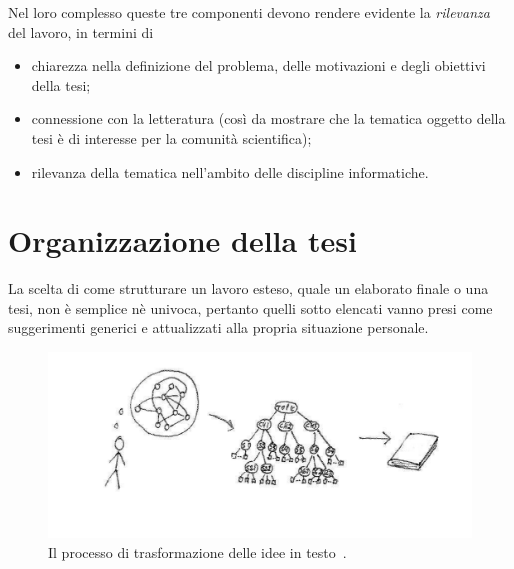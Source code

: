 \documentclass[12pt]{report}
\begin{document}
Nel loro complesso queste tre componenti devono rendere evidente la {\em rilevanza} del lavoro, in termini di
\begin{itemize}
\item chiarezza nella definizione del problema, delle motivazioni e degli obiettivi della tesi; 
\item connessione con la letteratura (cos\`i da mostrare che la tematica oggetto della tesi \`e di interesse per la comunit\`a scientifica);
\item rilevanza della tematica nell'ambito delle discipline informatiche.
\end{itemize}


\section{Organizzazione della tesi}
\label{sec:organizzazione}

La scelta di come strutturare un lavoro esteso, quale un elaborato finale o una tesi, non è semplice n\`{e} univoca, pertanto quelli sotto elencati vanno presi come suggerimenti generici e attualizzati alla propria situazione personale.

\begin{figure}[t]
	\centering
	\includegraphics[width = \textwidth, trim={0 25mm 0 0}, clip]{immagini/ideas2text}
	\caption{Il processo di trasformazione delle idee in testo~\cite{hamalainen2019web}.}
	\label{fig:ideas2text}
\end{figure}
\end{document}
